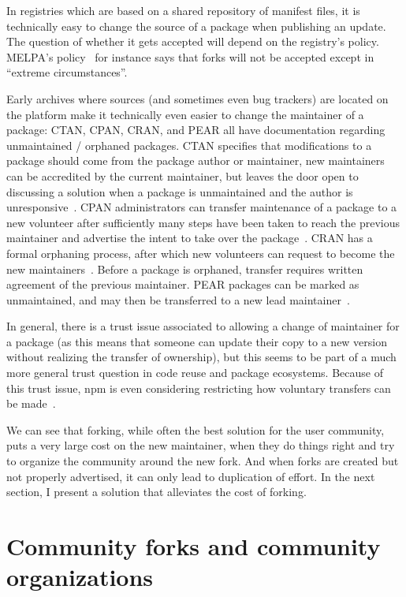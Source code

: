 In registries which are based on a shared repository of manifest files, it is technically easy to change the source of a package when publishing an update.
The question of whether it gets accepted will depend on the registry's policy.
MELPA's policy~\cite{melpa_contributing} for instance says that forks will not be accepted except in ``extreme circumstances''.

Early archives where sources (and sometimes even bug trackers) are located on the platform make it technically even easier to change the maintainer of a package: CTAN, CPAN, CRAN, and PEAR all have documentation regarding unmaintained / orphaned packages.
CTAN specifies that modifications to a package should come from the package author or maintainer, new maintainers can be accredited by the current maintainer, but leaves the door open to discussing a solution when a package is unmaintained and the author is unresponsive~\cite{ctan_orphaned}.
CPAN administrators can transfer maintenance of a package to a new volunteer after sufficiently many steps have been taken to reach the previous maintainer and advertise the intent to take over the package~\cite{cpan_faq}.
CRAN has a formal orphaning process, after which new volunteers can request to become the new maintainers~\cite{cran_policy}.
Before a package is orphaned, transfer requires written agreement of the previous maintainer.
PEAR packages can be marked as unmaintained, and may then be transferred to a new lead maintainer~\cite{pear_orphaned}.

In general, there is a trust issue associated to allowing a change of maintainer for a package (as this means that someone can update their copy to a new version without realizing the transfer of ownership), but this seems to be part of a much more general trust question in code reuse and package ecosystems.
Because of this trust issue, npm is even considering restricting how voluntary transfers can be made~\cite{npm-transfer}.

We can see that forking, while often the best solution for the user community, puts a very large cost on the new maintainer, when they do things right and try to organize the community around the new fork.
And when forks are created but not properly advertised, it can only lead to duplication of effort.
In the next section, I present a solution that alleviates the cost of forking.

\section{Community forks and community organizations}

